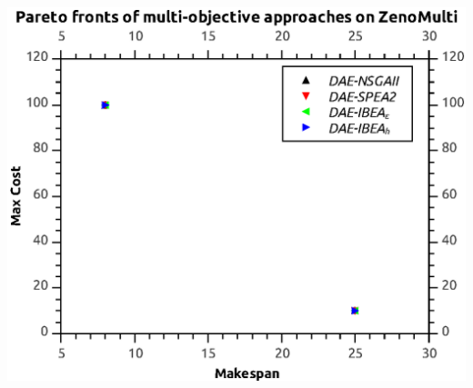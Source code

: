 \documentclass[a4paper,10pt]{report} %
\begin{document}
\begin{center}
 \includegraphics[bb=0 -0.250000 371.500 278.250]{./pareto_zeno_max.eps}
\end{center}
\end{document}
